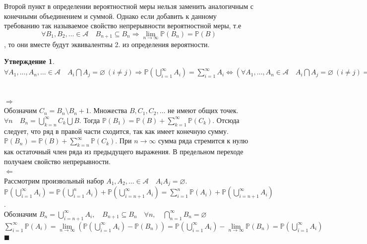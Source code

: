 \documentclass[12pt]{article}
\newtheorem{St}{Утверждение}
\newenvironment{Proof}{\par\noindent{\bf Доказательство}}{$\blacksquare$}
\numberwithin{Th}{section}
\numberwithin{Def}{section}
\numberwithin{Lem}{section}
\numberwithin{St}{section}
\numberwithin{equation}{section}
\newcommand\Pro{\mathbb{P}}
\newcommand\Ev{\mathscr{A}}
\begin{document}
Второй пункт в определении вероятностной меры нельзя заменить аналогичным с конечными объединением и суммой. Однако если добавить к данному требованию так 
называемое свойство непрерывности вероятностной меры, т.е $$\forall B_1, B_2, \ldots \in \Ev \quad B_{n+1} \subseteq B_n \Rightarrow \lim_{n \to \infty} \Pro(B_n) = \Pro(B)$$, то они вместе будут эквивалентны 2. из определения вероятности.

\begin{St}
$\forall A_1, \dots, A_n, \ldots \in \Ev \quad A_i \bigcap A_j  = \varnothing\  (i \not= j)  \Rightarrow \Pro (\bigcup\limits_{i=1}^{\infty} A_i) = \sum\limits_{i = 1}^{\infty} A_i
\Leftrightarrow ( \forall A_1, \dots, A_n \in \Ev \quad A_i \bigcap A_j  = \varnothing\  (i \not= j)  \Rightarrow \Pro (\bigcup\limits_{i=1}^{n} A_i) = \sum\limits_{i = 1}^{n} A_i)  \land  (\forall B_1, B_2, \ldots \in \Ev \quad B_{n+1} \subseteq B_n \Rightarrow \lim\limits_{n \to \infty} \Pro(B_n) = \Pro(B))$
\end{St}
\begin{Proof}
\\ $\Rightarrow$\\
Обозначим $C_n = B_n \setminus B_n+1$. Множества $B, C_1, C_2, \ldots$ не имеют общих точек.\\
$\forall n \quad B_n =  \bigcup\limits_{k=n}^{\infty} C_k \bigcup B$. Тогда $\Pro(B_1) = \Pro(B) + \sum\limits_{k=1}^{\infty} \Pro(C_k)$. Отсюда следует, что ряд в правой части сходится, так как имеет конечную сумму.
$\Pro(B_n) = \Pro(B) + \sum\limits_{k=n}^{\infty} \Pro(C_k)$. При $n \to \infty$ сумма ряда стремится к нулю как остаточный член ряда из предыдущего выражения.
В предельном переходе получаем свойство непрерывности.
\\ $\Leftarrow$\\
Рассмотрим произвольный набор $A_1, A_2, \ldots \in \Ev \quad A_iA_j = \varnothing$.\\
$\Pro(\bigcup\limits_{i=1}^{\infty} A_i) = \Pro(\bigcup\limits_{i=1}^{n} A_i) + \Pro(\bigcup\limits_{i=n + 1}^{\infty} A_i) =\sum\limits_{i = 1}^{n} \Pro(A_i) +  
\Pro(\bigcup\limits_{i=n + 1}^{\infty} A_i) $.\\
 Обозначим $B_n = \bigcup\limits_{i=n + 1}^{\infty} A_i,\quad B_{n+1} \subseteq B_n \quad \forall n,\quad \bigcap\limits_{n=1}^{\infty} B_n= \varnothing$ \\
$\sum\limits_{i=1}^{\infty} \Pro(A_i) = \lim\limits_{n \to \infty} (\Pro(\bigcup\limits_{i=1}^{\infty} A_i) - \Pro(B_n)) = \Pro(\bigcup\limits_{i=1}^{\infty} A_i) - \lim\limits_{n \to \infty} \Pro(B_n) = \Pro(\bigcup\limits_{i=1}^{\infty} A_i)$
\end{Proof}
\end{document}
